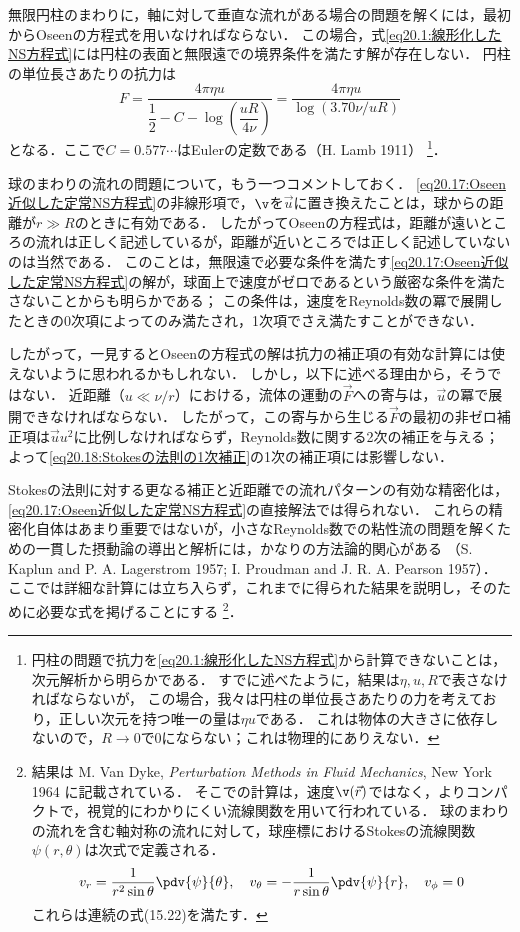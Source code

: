 無限円柱のまわりに，軸に対して垂直な流れがある場合の問題を解くには，最初からOseenの方程式を用いなければならない．
この場合，式\eqref{eq20.1:線形化したNS方程式}には円柱の表面と無限遠での境界条件を満たす解が存在しない．
円柱の単位長さあたりの抗力は
\begin{equation}
    F = \frac{4\pi\eta u}{ \dfrac{1}{2} -C -\log(\dfrac{uR}{4\nu}) }
    = \frac{4\pi\eta u}{ \log(3.70\nu/uR) }
\end{equation}
となる．ここで$C=0.577\cdots$はEulerの定数である（H. Lamb 1911）
\footnote{
円柱の問題で抗力を\eqref{eq20.1:線形化したNS方程式}から計算できないことは，次元解析から明らかである．
すでに述べたように，結果は$\eta,u,R$で表さなければならないが，
この場合，我々は円柱の単位長さあたりの力を考えており，正しい次元を持つ唯一の量は$\eta u$である．
これは物体の大きさに依存しないので，$R\to0$で0にならない；これは物理的にありえない．
}．



球のまわりの流れの問題について，もう一つコメントしておく．
\eqref{eq20.17:Oseen近似した定常NS方程式}の非線形項で，$\v$を$\vec{u}$に置き換えたことは，球からの距離が$r\gg R$のときに有効である．
したがってOseenの方程式は，距離が遠いところの流れは正しく記述しているが，距離が近いところでは正しく記述していないのは当然である．
このことは，無限遠で必要な条件を満たす\eqref{eq20.17:Oseen近似した定常NS方程式}の解が，球面上で速度がゼロであるという厳密な条件を満たさないことからも明らかである；
この条件は，速度をReynolds数の冪で展開したときの0次項によってのみ満たされ，1次項でさえ満たすことができない．


したがって，一見するとOseenの方程式の解は抗力の補正項の有効な計算には使えないように思われるかもしれない．
しかし，以下に述べる理由から，そうではない．
近距離（$u\ll\nu/r$）における，流体の運動の$\vec{F}$への寄与は，$\vec{u}$の冪で展開できなければならない．
したがって，この寄与から生じる$\vec{F}$の最初の非ゼロ補正項は$\vec{u}u^2$に比例しなければならず，Reynolds数に関する2次の補正を与える；
よって\eqref{eq20.18:Stokesの法則の1次補正}の1次の補正項には影響しない．


Stokesの法則に対する更なる補正と近距離での流れパターンの有効な精密化は，\eqref{eq20.17:Oseen近似した定常NS方程式}の直接解法では得られない．
これらの精密化自体はあまり重要ではないが，小さなReynolds数での粘性流の問題を解くための一貫した摂動論の導出と解析には，かなりの方法論的関心がある
（S. Kaplun and P. A. Lagerstrom 1957; I. Proudman and J. R. A. Pearson 1957）．
ここでは詳細な計算には立ち入らず，これまでに得られた結果を説明し，そのために必要な式を掲げることにする
\footnote{
結果は
M. Van Dyke, \textit{Perturbation Methods in Fluid Mechanics}, New York 1964
に記載されている．
そこでの計算は，速度$\v(\vec{r})$ではなく，よりコンパクトで，視覚的にわかりにくい流線関数を用いて行われている．
球のまわりの流れを含む軸対称の流れに対して，球座標におけるStokesの流線関数$\psi(r,\theta)$は次式で定義される．
\[
    v_r = \frac{1}{r^2\sin\theta} \pdv{\psi}{\theta}, \quad
    v_\theta = -\frac{1}{r\sin\theta} \pdv{\psi}{r}, \quad
    v_\phi = 0
\]
これらは連続の式(15.22)を満たす．
}．



